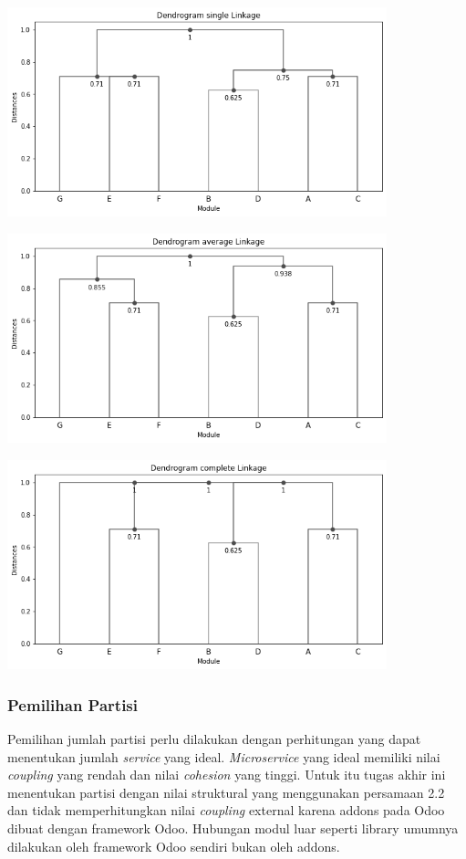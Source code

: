 \begin{center}
	\includegraphics[width=11cm]{img/bab_3/singleLink.png}
	\label{fig:asd}
\end{center}
\begin{center}
	\includegraphics[width=11cm]{img/bab_3/averageLink.png}
	\label{fig:asd}
\end{center}
\begin{center}
	\includegraphics[width=11cm]{img/bab_3/completeLink.png}
	\label{fig:asd}
\end{center}

\subsubsection{Pemilihan Partisi}
Pemilihan jumlah partisi perlu dilakukan dengan perhitungan yang dapat menentukan jumlah \textit{service} yang ideal. \textit{Microservice} yang ideal memiliki nilai \textit{coupling} yang rendah dan nilai \textit{cohesion} yang tinggi. Untuk itu tugas akhir ini menentukan partisi dengan nilai struktural yang menggunakan persamaan 2.2 dan tidak memperhitungkan nilai \textit{coupling} external karena addons pada Odoo dibuat dengan framework Odoo. Hubungan modul luar seperti library umumnya dilakukan oleh framework Odoo sendiri bukan oleh addons.

